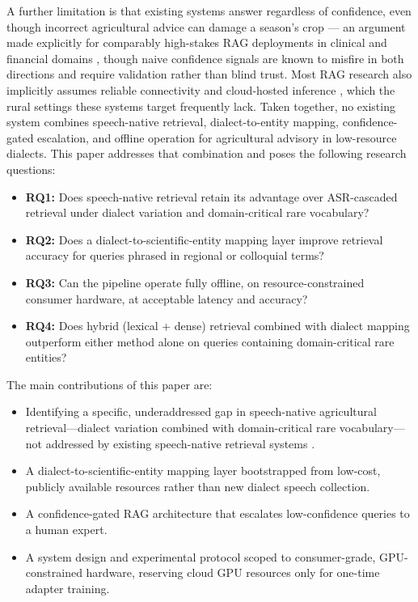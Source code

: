 \documentclass[conference]{IEEEtran}
\begin{document}
A further limitation is that existing systems answer regardless of confidence, even though incorrect agricultural advice can damage a season's crop — an argument made explicitly for comparably high-stakes RAG deployments in clinical and financial domains \cite{dependablerag2026, abstinence2025}, though naive confidence signals are known to misfire in both directions \cite{intrygue2026} and require validation rather than blind trust. Most RAG research also implicitly assumes reliable connectivity and cloud-hosted inference \cite{compactllm2026}, which the rural settings these systems target frequently lack. Taken together, no existing system combines speech-native retrieval, dialect-to-entity mapping, confidence-gated escalation, and offline operation for agricultural advisory in low-resource dialects. This paper addresses that combination and poses the following research questions:

\begin{itemize}
    \item \textbf{RQ1:} Does speech-native retrieval retain its advantage over ASR-cascaded retrieval under dialect variation and domain-critical rare vocabulary?

    \item \textbf{RQ2:} Does a dialect-to-scientific-entity mapping layer improve retrieval accuracy for queries phrased in regional or colloquial terms?

    \item \textbf{RQ3:} Can the pipeline operate fully offline, on resource-constrained consumer hardware, at acceptable latency and accuracy?

    \item \textbf{RQ4:} Does hybrid (lexical + dense) retrieval combined with dialect mapping outperform either method alone on queries containing domain-critical rare entities?
\end{itemize}

The main contributions of this paper are:


\begin{itemize}
    \item Identifying a specific, underaddressed gap in speech-native agricultural retrieval---dialect variation combined with domain-critical rare vocabulary---not addressed by existing speech-native retrieval systems \cite{min2025speechrag, google2025s2r}.

    \item A dialect-to-scientific-entity mapping layer bootstrapped from low-cost, publicly available resources rather than new dialect speech collection.

    \item A confidence-gated RAG architecture that escalates low-confidence queries to a human expert.

    \item A system design and experimental protocol scoped to consumer-grade, GPU-constrained hardware, reserving cloud GPU resources only for one-time adapter training.
\end{itemize}
\end{document}
